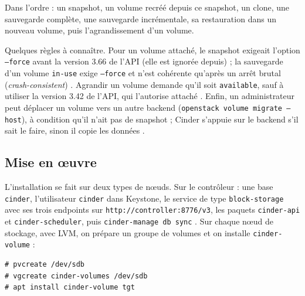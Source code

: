 Dans l'ordre : un snapshot, un volume recréé depuis ce snapshot, un clone, une sauvegarde complète, une sauvegarde
incrémentale, sa restauration dans un nouveau volume, puis l'agrandissement d'un volume.

Quelques règles à connaître. Pour un volume attaché, le snapshot exigeait l'option \texttt{--force} avant la version 3.66
de l'API (elle est ignorée depuis) \parencite{osc-volume-snapshot} ; la sauvegarde d'un volume \texttt{in-use} exige
\texttt{--force} et n'est cohérente qu'après un arrêt brutal (\emph{crash-consistent}) \parencite{cinder-backups}. Agrandir un
volume demande qu'il soit \texttt{available}, sauf à utiliser la version 3.42 de l'API, qui l'autorise attaché
\parencite{cinder-cli-volumes}. Enfin, un administrateur peut déplacer un volume vers un autre backend
(\texttt{openstack volume migrate --host}), à condition qu'il n'ait pas de snapshot ; Cinder s'appuie sur le backend s'il
sait le faire, sinon il copie les données \parencite{cinder-migration}.

\subsection{Mise en œuvre}\label{sec:ci-deploiement}

L'installation se fait sur deux types de nœuds. Sur le contrôleur : une base \texttt{cinder}, l'utilisateur \texttt{cinder} dans
Keystone, le service de type \texttt{block-storage} avec ses trois endpoints sur \texttt{http://controller:8776/v3}, les paquets
\texttt{cinder-api} et \texttt{cinder-scheduler}, puis \texttt{cinder-manage db sync} \parencite{cinder-install-controller}.
Sur chaque nœud de stockage, avec LVM, on prépare un groupe de volumes et on installe \texttt{cinder-volume}
\parencite{cinder-install-storage} :

\par\noindent\begin{minipage}{\linewidth}
\begin{lstlisting}[style=terminal]
# pvcreate /dev/sdb
# vgcreate cinder-volumes /dev/sdb
# apt install cinder-volume tgt
\end{lstlisting}
\end{minipage}\par


